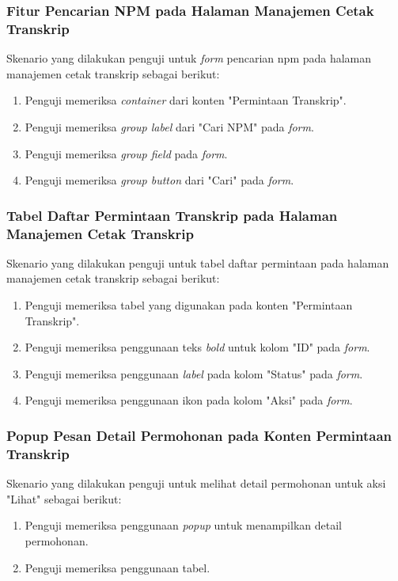 \subsubsection{Fitur Pencarian NPM pada Halaman Manajemen Cetak Transkrip}
Skenario yang dilakukan penguji untuk \textit{form} pencarian npm pada halaman manajemen cetak transkrip sebagai berikut:
\begin{enumerate}
	\item Penguji memeriksa \textit{container} dari konten "Permintaan Transkrip".
	\item Penguji memeriksa \textit{group label} dari "Cari NPM" pada \textit{form}.	
	\item Penguji memeriksa \textit{group field} pada \textit{form}.	
	\item Penguji memeriksa \textit{group button} dari "Cari" pada \textit{form}.
\end{enumerate}

\subsubsection{Tabel Daftar Permintaan Transkrip pada Halaman Manajemen Cetak Transkrip}
Skenario yang dilakukan penguji untuk tabel daftar permintaan pada halaman manajemen cetak transkrip sebagai berikut:
\begin{enumerate}
	\item Penguji memeriksa tabel yang digunakan pada konten "Permintaan Transkrip".
	\item Penguji memeriksa penggunaan teks \textit{bold} untuk kolom "ID" pada \textit{form}.
	\item Penguji memeriksa penggunaan \textit{label} pada kolom "Status" pada \textit{form}.
	\item Penguji memeriksa penggunaan ikon pada kolom "Aksi" pada \textit{form}.
\end{enumerate}

\subsubsection{Popup Pesan Detail Permohonan pada Konten Permintaan Transkrip}
Skenario yang dilakukan penguji untuk melihat detail permohonan untuk aksi "Lihat" sebagai berikut:
\begin{enumerate}
	\item Penguji memeriksa penggunaan \textit{popup} untuk menampilkan detail permohonan.
	\item Penguji memeriksa penggunaan tabel.	
\end{enumerate}

